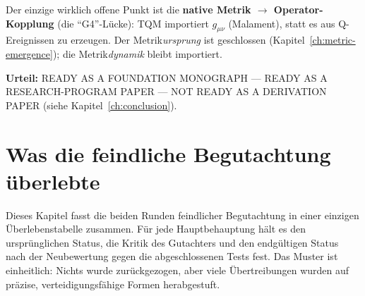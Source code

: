 \documentclass[10pt,twoside,openany]{book}
\begin{document}
Der einzige wirklich offene Punkt ist die \textbf{native Metrik $\to$ Operator-Kopplung}
(die ``G4''-Lücke): TQM importiert $g_{\mu\nu}$ (Malament), statt es aus Q-Ereignissen zu
erzeugen. Der Metrik\emph{ursprung} ist geschlossen
(Kapitel~\ref{ch:metric-emergence}); die Metrik\emph{dynamik} bleibt importiert.

\textbf{Urteil:} READY AS A FOUNDATION MONOGRAPH --- READY AS A RESEARCH-PROGRAM PAPER
--- NOT READY AS A DERIVATION PAPER (siehe Kapitel~\ref{ch:conclusion}).


\chapter{Was die feindliche Begutachtung überlebte}
\label{ch:survived}

Dieses Kapitel fasst die beiden Runden feindlicher Begutachtung in einer einzigen
Überlebenstabelle zusammen. Für jede Hauptbehauptung hält es den ursprünglichen Status,
die Kritik des Gutachters und den endgültigen Status nach der Neubewertung gegen die
abgeschlossenen Tests fest. Das Muster ist einheitlich: Nichts wurde zurückgezogen, aber
viele Übertreibungen wurden auf präzise, verteidigungsfähige Formen herabgestuft.
\end{document}
